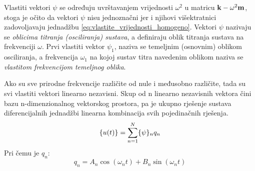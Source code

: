 Vlastiti vektori $\psi$ se određuju uvrštavanjem vrijednosti $\omega^2$ u matricu
$\mathbf{k}-\omega^2\mathbf{m}$, stoga je očito da vektori $\psi$ nisu jednoznačni jer i njihovi
višektratnici zadovoljavaju jednadžbu \eqref{eq:vlastite_vrijednosti_homogeno}.
Vektori $\psi$ nazivaju se \textit{oblicima titranja (osciliranja) sustava}, 
a definiraju oblik titranja
sustava na frekvenciji $\omega$. Prvi vlastiti vektor $\psi_1$, naziva se temeljnim
(osnovnim) oblikom osciliranja, a frekvencija $\omega_1$ na kojoj sustav titra navedenim
oblikom naziva se \textit{vlastitom frekvencijom temeljnog oblika}.
\par

Ako su sve prirodne frekvencije različite od nule i međusobno različite, tada su svi
vlastiti vektori linearno nezavisni. Skup od n linearno nezavisnih vektora čini bazu
n-dimenzionalnog vektorskog prostora, pa je ukupno rješenje sustava diferencijalnih
jednadžbi linearna kombinacija svih pojedinačnih rješenja.
\begin{equation}\label{eq:opce_rjesenje_sustava}
    \vtor{u(t)}{}=\sum_{n=1}^N\vtor{\psi}{}_nq_n 
\end{equation}
Pri čemu je $q_n$:
\begin{equation}
    q_n=A_n\cos(\omega_n t) + B_n\sin(\omega_n t)
\end{equation}

